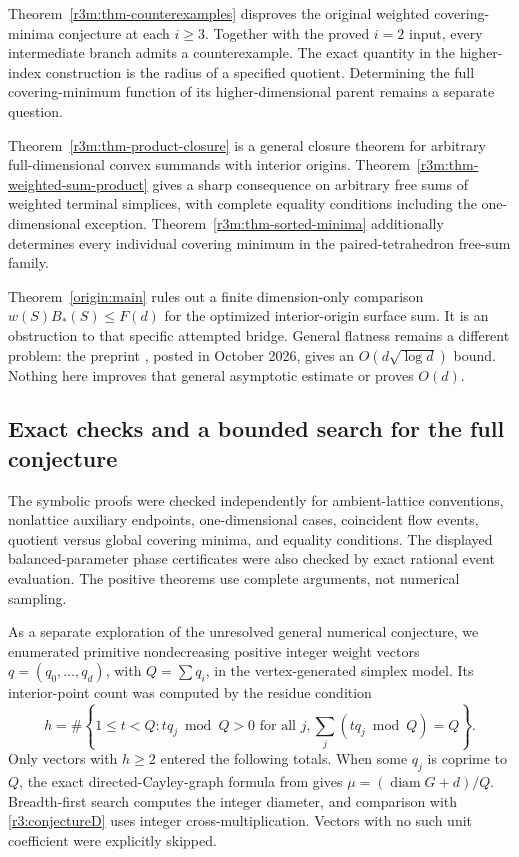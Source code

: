 \documentclass[11pt,a4paper]{article}
\theoremstyle{remark}\newtheorem{remark}[theorem]{Remark}
\DeclareMathOperator{\diam}{diam}
\begin{document}
Theorem~\ref{r3m:thm-counterexamples} disproves the original weighted
covering-minima conjecture at each $i\ge3$. Together with the proved
$i=2$ input, every intermediate branch admits a counterexample.
The exact quantity in the higher-index construction is the radius
of a specified quotient. Determining the full covering-minimum
function of its higher-dimensional parent remains a separate question.

Theorem~\ref{r3m:thm-product-closure} is a general closure theorem
for arbitrary full-dimensional convex summands with interior origins.
Theorem~\ref{r3m:thm-weighted-sum-product} gives a sharp consequence
on arbitrary free sums of weighted terminal simplices, with complete
equality conditions including the one-dimensional exception.
Theorem~\ref{r3m:thm-sorted-minima} additionally determines every
individual covering minimum in the paired-tetrahedron free-sum family.

Theorem~\ref{origin:main} rules out a finite dimension-only comparison
$w(S)B_*(S)\le F(d)$ for the optimized interior-origin surface sum.
It is an obstruction to that specific attempted bridge. General
flatness remains a different problem: the preprint
\cite{LRR}, posted in October 2026, gives an
$O(d\sqrt{\log d})$ bound. Nothing here improves that general
asymptotic estimate or proves $O(d)$.

\subsection{Exact checks and a bounded search for the full conjecture}

The symbolic proofs were checked independently for ambient-lattice
conventions, nonlattice auxiliary endpoints, one-dimensional cases,
coincident flow events, quotient versus global covering minima,
and equality conditions. The displayed balanced-parameter phase
certificates were also checked by exact rational event evaluation.
The positive theorems use complete arguments, not numerical sampling.

As a separate exploration of the unresolved general numerical
conjecture, we enumerated primitive nondecreasing positive integer
weight vectors $q=(q_0,\ldots,q_d)$, with $Q=\sum q_i$, in the
vertex-generated simplex model. Its interior-point count was computed
by the residue condition
\[
 h=\#\left\{1\le t<Q:
      tq_j\bmod Q>0\text{ for all }j,
      \sum_j(tq_j\bmod Q)=Q\right\}.
\]
Only vectors with $h\ge2$ entered the following totals. When some
$q_j$ is coprime to $Q$, the exact directed-Cayley-graph formula
from \cite[Appendix B]{CSS} gives
$\mu=(\diam G+d)/Q$. Breadth-first search computes the integer
diameter, and comparison with \eqref{r3:conjectureD} uses integer
cross-multiplication. Vectors with no such unit coefficient were
explicitly skipped.
\end{document}
